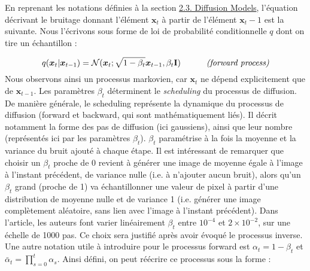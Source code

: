 \documentclass{article}
\begin{document}
\begin{spacing}{1}
En reprenant les notations définies à la section \hyperref[sec:diffusion_models]{2.3. Diffusion Models}, l'équation décrivant le bruitage donnant l'élément $\boldsymbol{x}_t$ à partir de l'élément $\boldsymbol{x}_t-1$ est la suivante. Nous l'écrivons sous forme de loi de probabilité conditionnelle $q$ dont on tire un échantillon :
\end{spacing}
\large
$$q(\boldsymbol{x}_t|\boldsymbol{x}_{t-1}) = \mathcal{N}(\boldsymbol{x}_t;\sqrt{1-\beta_t}\boldsymbol{x}_{t-1},\beta_t\textbf{I}) \textit{\quad \quad \quad (forward process)}$$
\normalsize
Nous observons ainsi un processus markovien, car $\boldsymbol{x}_t$ ne dépend explicitement que de $\boldsymbol{x}_{t-1}$. Les paramètres $\beta_t$ déterminent le \textit{scheduling} du processus de diffusion. De manière générale, le scheduling représente la dynamique du processus de diffusion (forward et backward, qui sont mathématiquement liés). Il décrit notamment la forme des pas de diffusion (ici gaussiens), ainsi que leur nombre (représentés ici par les paramètres $\beta_t$). $\beta_t$ paramétrise à la fois la moyenne et la variance du bruit ajouté à chaque étape.  Il est intéressant de remarquer que choisir un $\beta_t$ proche de 0 revient à générer une image de moyenne égale à l'image à l'instant précédent, de variance nulle (i.e. à n'ajouter aucun bruit), alors qu'un $\beta_t$ grand (proche de 1) va échantillonner une valeur de pixel à partir d'une distribution de moyenne nulle et de variance 1 (i.e. générer une image complètement aléatoire, sans lien avec l'image à l'instant précédent). Dans l'article, les auteurs font varier linéairement $\beta_t$ entre $10^{-4}$ et $2 \times 10^{-2}$, sur une échelle de 1000 pas. Ce choix sera justifié après avoir évoqué le processus inverse.\\
Une autre notation utile à introduire pour le processus forward est $\alpha_t = 1 - \beta_t$ et $\bar\alpha_t = \prod_{s=0}^t \alpha_s$. Ainsi défini, on peut réécrire ce processus sous la forme :
\end{document}
